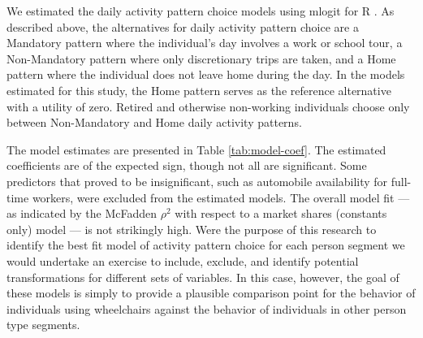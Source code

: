 \documentclass[3p, authoryear, review]{elsarticle} %
\begin{document}
We estimated the daily activity pattern choice models using mlogit for R
\citep[\citet{mlogit2020}]{R-base}. As described above, the alternatives for daily activity
pattern choice are a Mandatory pattern where the individual's day involves a
work or school tour, a Non-Mandatory pattern where only discretionary trips are
taken, and a Home pattern where the individual does not leave home during the
day. In the models estimated for this study, the Home pattern serves as the
reference alternative with a utility of zero. Retired and otherwise non-working
individuals choose only between Non-Mandatory and Home daily activity patterns.

The model estimates are presented in
Table \ref{tab:model-coef}.
The estimated coefficients are of the expected sign, though not all are significant.
Some predictors that proved to be insignificant, such as automobile availability
for full-time workers, were excluded from the estimated models.
The overall model fit --- as indicated by the McFadden \(\rho^2\) with respect to
a market shares (constants only) model --- is not strikingly high. Were the purpose
of this research to identify the best fit model of activity pattern choice for
each person segment we would undertake an exercise to include, exclude, and identify
potential transformations for different sets of variables. In this case, however,
the goal of these models is simply to provide a plausible comparison point for
the behavior of individuals using wheelchairs against the behavior of individuals
in other person type segments.
\end{document}
